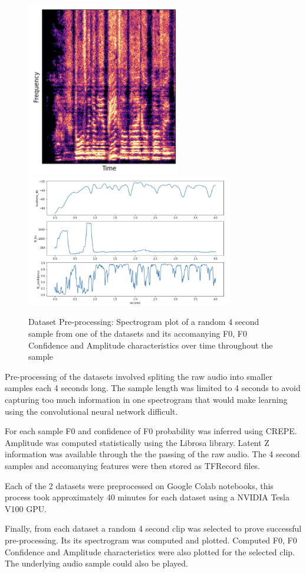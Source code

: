\begin{figure}
    \centering
    \includegraphics[width=0.6\textwidth]{research/dataset_preparation/PreprocessingSpecplot.png}
    \includegraphics[width=0.8\textwidth]{research/dataset_preparation/PreprocessingFeatures.png}
    \caption{Dataset Pre-processing: Spectrogram plot of a random 4 second sample from one of the datasets and its accomanying F0, F0 Confidence and Amplitude characteristics over time throughout the sample}
\end{figure}

Pre-processing of the datasets involved spliting the raw audio into smaller samples each 4 seconds long. The sample length was limited to 4 seconds to avoid capturing too much information in one spectrogram that would make learning using the convolutional neural network difficult.

For each sample F0 and confidence of F0 probability was inferred using CREPE\cite{CREPE}. Amplitude was computed statistically using the Librosa library\cite{LibrosaPip}. Latent Z information was available through the the passing of the raw audio. The 4 second samples and accomanying features were then stored as TFRecord files.

Each of the 2 datasets were preprocessed on Google Colab notebooks, this process took approximately 40 minutes for each dataset using a NVIDIA Tesla V100 GPU.

Finally, from each dataset a random 4 second clip was selected to prove successful pre-processing. Its its spectrogram was computed and plotted. Computed F0, F0 Confidence and Amplitude characteristics were also plotted for the selected clip. The underlying audio sample could also be played.